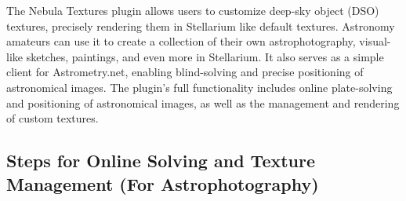 The Nebula Textures plugin allows users to customize deep-sky object (DSO) textures, precisely 
rendering them in Stellarium like default textures. Astronomy amateurs can use it to create 
a collection of their own astrophotography, visual-like sketches, paintings, and even more in 
Stellarium. It also serves as a simple client for Astrometry.net, enabling blind-solving and precise 
positioning of astronomical images. The plugin's full functionality includes online plate-solving 
and positioning of astronomical images, as well as the management and rendering of custom textures.

\subsection{Steps for Online Solving and Texture Management (For Astrophotography)}
